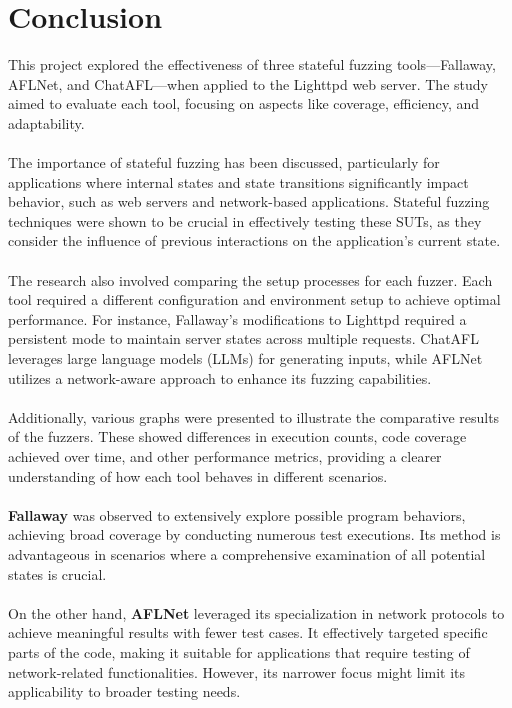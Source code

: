 \chapter{Conclusion} 
\label{chap:Conclusion}
This project explored the effectiveness of three stateful fuzzing tools—Fallaway, AFLNet, and ChatAFL—when applied to the Lighttpd web server. The study aimed to evaluate each tool, focusing on aspects like coverage, efficiency, and adaptability.
\\\\The importance of stateful fuzzing has been discussed, particularly for applications where internal states and state transitions significantly impact behavior, such as web servers and network-based applications. Stateful fuzzing techniques were shown to be crucial in effectively testing these SUTs, as they consider the influence of previous interactions on the application's current state.
\\\\The research also involved comparing the setup processes for each fuzzer. Each tool required a different configuration and environment setup to achieve optimal performance. For instance, Fallaway's modifications to Lighttpd required a persistent mode to maintain server states across multiple requests. ChatAFL leverages large language models (LLMs) for generating inputs, while AFLNet utilizes a network-aware approach to enhance its fuzzing capabilities.
\\\\Additionally, various graphs were presented to illustrate the comparative results of the fuzzers. These showed differences in execution counts, code coverage achieved over time, and other performance metrics, providing a clearer understanding of how each tool behaves in different scenarios. 
\\\\\textbf{Fallaway} was observed to extensively explore possible program behaviors, achieving broad coverage by conducting numerous test executions. Its method is advantageous in scenarios where a comprehensive examination of all potential states is crucial.
\\\\On the other hand, \textbf{AFLNet} leveraged its specialization in network protocols to achieve meaningful results with fewer test cases. It effectively targeted specific parts of the code, making it suitable for applications that require testing of network-related functionalities. However, its narrower focus might limit its applicability to broader testing needs.
